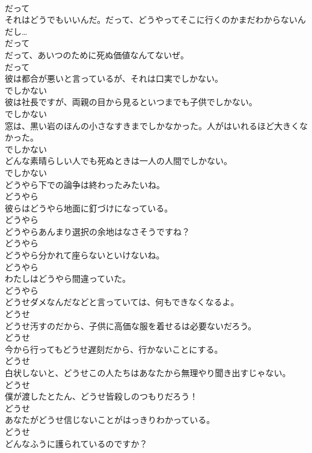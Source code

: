 \documentclass[8pt]{extreport}
\begin{document}
\begin{CJK}{UTF8}{min}
\\	だって	
\\	それはどうでもいいんだ。だって、どうやってそこに行くのかまだわからないんだし…	
\\	だって	
\\	だって、あいつのために死ぬ価値なんてないぜ。	
\\	だって	
\\	彼は都合が悪いと言っているが、それは口実でしかない。	
\\	でしかない	
\\	彼は社長ですが、両親の目から見るといつまでも子供でしかない。	
\\	でしかない	
\\	窓は、黒い岩のほんの小さなすきまでしかなかった。人がはいれるほど大きくなかった。	
\\	でしかない	
\\	どんな素晴らしい人でも死ぬときは一人の人間でしかない。	
\\	でしかない	
\\	どうやら下での論争は終わったみたいね。	
\\	どうやら	
\\	彼らはどうやら地面に釘づけになっている。	
\\	どうやら	
\\	どうやらあんまり選択の余地はなさそうですね？	
\\	どうやら	
\\	どうやら分かれて座らないといけないね。	
\\	どうやら	
\\	わたしはどうやら間違っていた。	
\\	どうやら	
\\	どうせダメなんだなどと言っていては、何もできなくなるよ。	
\\	どうせ	
\\	どうせ汚すのだから、子供に高価な服を着せるは必要ないだろう。	
\\	どうせ	
\\	今から行ってもどうせ遅刻だから、行かないことにする。	
\\	どうせ	
\\	白状しないと、どうせこの人たちはあなたから無理やり聞き出すじゃない。	
\\	どうせ	
\\	僕が渡したとたん、どうせ皆殺しのつもりだろう！	
\\	どうせ	
\\	あなたがどうせ信じないことがはっきりわかっている。	
\\	どうせ	
\\	どんなふうに護られているのですか？	

\end{CJK}
\end{document}
